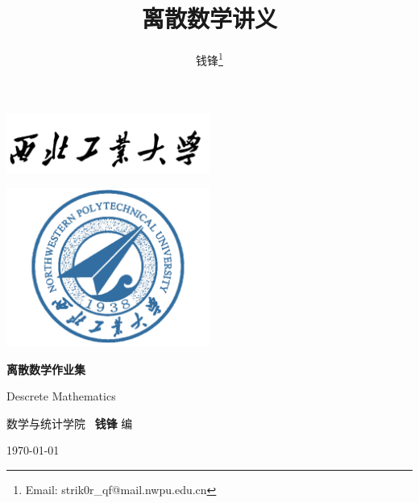\documentclass[10pt,UTF8]{ctexbook} %
\title{\textbf{离散数学}讲义}
\author{钱锋\thanks{Email: strik0r\_qf@mail.nwpu.edu.cn}}
\begin{document}


\begin{titlepage}
    \thispagestyle{empty}
    \centering
        \vspace*{2cm}
        \includegraphics[width=0.5\textwidth]{pic/npu_2.png}\par
        \vspace{1cm}
        \includegraphics[width=0.5\textwidth]{pic/npu_1.png}\par
    \vspace{1cm}
        \begin{center}
            \Huge \heiti \textbf{离散数学作业集}

            Descrete Mathematics
        \end{center}
        \vspace{5cm}
        \begin{center}
        \songti
        \kaishu 数学与统计学院 \, \heiti\textbf{钱锋} \quad \songti 编
        \vspace{0.5cm}

    \today
    \end{center}
\end{titlepage}

\frontmatter
\newpage
\pagestyle{plain}
\makeatother

% 


\end{document}
